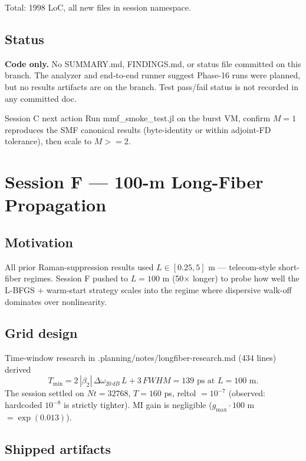 \documentclass[11pt,letterpaper]{article}
\def\mathrm#1{#1}%
\def\geq{>=}%
\def\texttt#1{#1}%
\begin{document}
Total: 1998 LoC, all new files in session namespace.

\subsection{Status}

\textbf{Code only.} No \texttt{SUMMARY.md}, \texttt{FINDINGS.md}, or status file committed on this branch. The analyzer and end-to-end runner suggest Phase-16 runs were planned, but no results artifacts are on the branch. Test pass/fail status is not recorded in any committed doc.

\begin{blocker}{Session C next action}
Run \texttt{mmf\_smoke\_test.jl} on the burst VM, confirm $M=1$ reproduces the SMF canonical results (byte-identity or within adjoint-FD tolerance), then scale to $M \geq 2$.
\end{blocker}

\newpage
\section{Session F --- 100-m Long-Fiber Propagation}
\label{sec:sessionF}

\subsection{Motivation}

All prior Raman-suppression results used $L \in [0.25, 5]$ m --- telecom-style short-fiber regimes. Session F pushed to $L = 100$ m (50$\times$ longer) to probe how well the L-BFGS $+$ warm-start strategy scales into the regime where dispersive walk-off dominates over nonlinearity.

\subsection{Grid design}

Time-window research in \texttt{.planning/notes/longfiber-research.md} (434 lines) derived
\[
  T_{\min} = 2 \, |\beta_2| \, \Delta\omega_{20\,\mathrm{dB}} \, L + 3 \, \mathrm{FWHM} = 139\text{ ps at } L = 100\text{ m.}
\]
The session settled on $\mathrm{Nt} = 32768$, $T = 160$ ps, \texttt{reltol $= 10^{-7}$} (observed: hardcoded $10^{-8}$ is strictly tighter). MI gain is negligible ($g_{\max} \cdot 100$ m $= \exp(0.013)$).

\subsection{Shipped artifacts}
\end{document}
